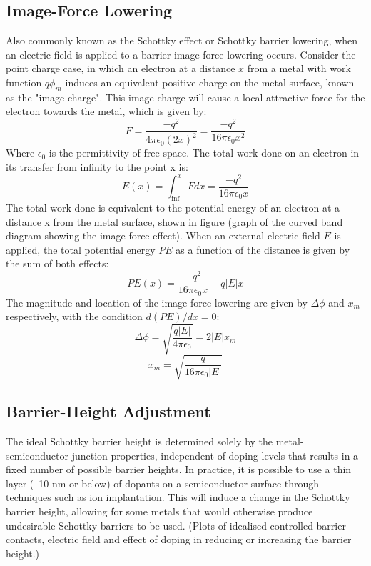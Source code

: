 \subsection{Image-Force Lowering}
Also commonly known as the Schottky effect or Schottky barrier lowering, when an electric field is applied to a barrier image-force lowering occurs. Consider the point charge case, in which an electron at a distance $x$ from a metal with work function $q\phi_{m}$ induces an equivalent positive charge on the metal surface, known as the "image charge". This image charge will cause a local attractive force for the electron towards the metal, which is given by:
\begin{equation}
	F=\frac{-q^{2}}{4\pi \epsilon_{0} (2x)^{2}}=\frac{-q^{2}}{16\pi\epsilon_{0}x^{2}}
	\label{eq:image force effect force}
\end{equation}
Where $\epsilon_{0}$ is the permittivity of free space. The total work done on an electron in its transfer from infinity to the point x is:
\begin{equation}
	E(x)= \int_{\inf}^{x} Fdx = \frac{-q^{2}}{16\pi\epsilon_{0}x}
	\label{eq:image force work done integral}
\end{equation}
The total work done is equivalent to the potential energy of an electron at a distance x from the metal surface, shown in figure (graph of the curved band diagram showing the image force effect). When an external electric field $E$ is applied, the total potential energy $PE$ as a function of the distance is given by the sum of both effects:
\begin{equation}
	PE(x) = \frac{-q^{2}}{16\pi\epsilon_{0}x} - q\left|E\right|x
	\label{eq:image force total potential energy}
\end{equation}
The magnitude and location of the image-force lowering are given by $\Delta\phi$ and $x_{m}$ respectively, with the condition $d(PE)/dx = 0$:
\begin{equation}
	\Delta\phi = \sqrt{\frac{q\left|E\right|}{4\pi\epsilon_{0}}}=2\left|E\right|x_{m}
	\label{eq:image force lowering magnitude}
\end{equation}
\begin{equation}
	x_{m} = \sqrt{\frac{q}{16\pi\epsilon_{0}\left|E\right|}}
	\label{eq:image force lowering location}
\end{equation}

\subsection{Barrier-Height Adjustment}
The ideal Schottky barrier height is determined solely by the metal-semiconductor junction properties, independent of doping levels that results in a fixed number of possible barrier heights. In practice, it is possible to use a thin layer (~10 nm or below) of dopants on a semiconductor surface through techniques such as ion implantation. This will induce a change in the Schottky barrier height, allowing for some metals that would otherwise produce undesirable Schottky barriers to be used. (Plots of idealised controlled barrier contacts, electric field and effect of doping in reducing or increasing the barrier height.)

